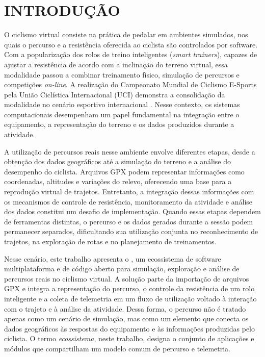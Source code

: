 
\chapter{INTRODUÇÃO}
\label{cap:introducao}

O ciclismo virtual consiste na prática de pedalar em ambientes simulados, nos
quais o percurso e a resistência oferecida ao ciclista são controlados por
software. Com a popularização dos rolos de treino inteligentes
(\textit{smart trainers}), capazes de ajustar a resistência de acordo com a
inclinação do terreno virtual, essa modalidade passou a combinar treinamento
físico, simulação de percursos e competições \textit{on-line}. A realização do
Campeonato Mundial de Ciclismo E-Sports pela União Ciclística Internacional
(UCI) demonstra a consolidação da modalidade no cenário esportivo internacional
\cite{uci2026}. Nesse contexto, os sistemas computacionais desempenham um papel
fundamental na integração entre o equipamento, a representação do terreno e os
dados produzidos durante a atividade.

A utilização de percursos reais nesse ambiente envolve diferentes etapas, desde
a obtenção dos dados geográficos até a simulação do terreno e a análise do
desempenho do ciclista. Arquivos GPX podem representar informações como
coordenadas, altitudes e variações do relevo, oferecendo uma base para a
reprodução virtual de trajetos. Entretanto, a integração dessas informações com
os mecanismos de controle de resistência, monitoramento da atividade e análise
dos dados constitui um desafio de implementação. Quando essas etapas dependem
de ferramentas distintas, o percurso e os dados gerados durante a sessão podem
permanecer separados, dificultando sua utilização conjunta no reconhecimento de
trajetos, na exploração de rotas e no planejamento de treinamentos.

Nesse cenário, este trabalho apresenta o \argus{}, um ecossistema de software
multiplataforma e de código aberto para simulação, exploração e análise de
percursos reais no ciclismo virtual. A solução parte da importação de arquivos
GPX e integra a representação do percurso, o controle da resistência de um rolo
inteligente e a coleta de telemetria em um fluxo de utilização voltado à
interação com o trajeto e à análise da atividade. Dessa forma, o percurso não é
tratado apenas como um cenário de simulação, mas como um elemento que conecta
os dados geográficos às respostas do equipamento e às informações produzidas
pelo ciclista. O termo \textit{ecossistema}, neste trabalho, designa o conjunto
de aplicações e módulos que compartilham um modelo comum de percurso e
telemetria.

